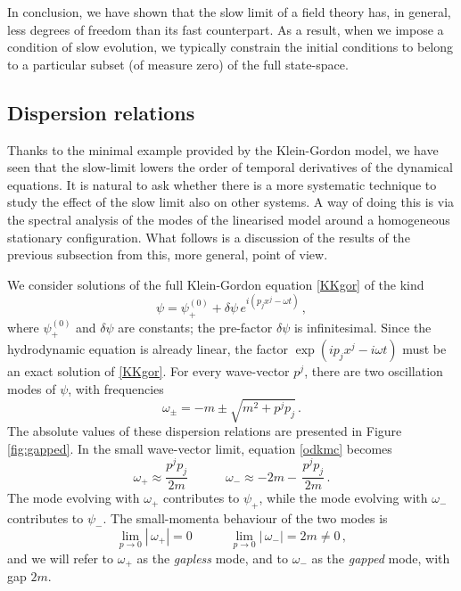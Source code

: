 \documentclass[a4paper, amsfonts, amssymb, amsmath, reprint, twocolumn, showkeys, nofootinbib]{revtex4-2}
\begin{document}
In conclusion, we have shown that the slow limit of a field theory has, in general, less degrees of freedom than its fast counterpart. As a result, when we impose a condition of slow evolution, we typically constrain the initial conditions to belong to a particular subset (of measure zero) of the full state-space. 

\subsection{Dispersion relations}\label{Latechnicadeimodi}
 
Thanks to the minimal example provided by the Klein-Gordon model, we have seen that the slow-limit lowers the order of temporal derivatives of the dynamical equations. 
It is natural to ask whether there is a more systematic technique to study the effect of the slow limit also on other systems. 
A way of doing this is via  the spectral analysis of the modes of the linearised model around a homogeneous stationary configuration. 
What follows is a discussion of the results of the previous subsection from this, more general, point of view.

We consider solutions of the full Klein-Gordon equation \eqref{KKgor} of the kind
\begin{equation}
\psi= \psi_+^{(0)} + \delta \psi \, e^{i(p_j x^j-\omega t)} \, ,
\end{equation} 
where $\psi_+^{(0)}$ and $\delta \psi$ are constants; the pre-factor $\delta \psi$ is infinitesimal. Since the hydrodynamic equation is already linear, the factor $\exp(ip_j x^j-i\omega t)$ must be an exact solution of \eqref{KKgor}.   
For every wave-vector $p^j$, there are two oscillation modes of  $\psi$, with frequencies
\begin{equation}\label{odkmc}
\omega_{\pm} = -m \pm \sqrt{m^2 + p^j p_j} \, .
\end{equation}
The absolute values of these dispersion relations are presented in Figure \ref{fig:gapped}. In the small wave-vector limit, equation \eqref{odkmc} becomes
\begin{equation}
\omega_+ \approx \dfrac{p^j p_j}{2m}  \quad  \quad \quad    
\omega_- \approx -2m- \, \dfrac{p^j p_j}{2m} \, .
\end{equation}
The  mode evolving with $\omega_+$  contributes to $\psi_+$, while the  mode evolving with $\omega_-$ contributes to $\psi_-$. The small-momenta behaviour of the two modes is
\begin{equation}
\lim_{p \rightarrow 0} \left\lvert \, \omega_+ \right\rvert =0
\quad \quad \quad 
\lim_{p \rightarrow 0} \left\lvert \, \omega_- \right\rvert =2m \neq 0 \, ,
\end{equation}
and  we will refer to $\omega_+$ as the \emph{gapless} mode, and  to $\omega_-$ as the \emph{gapped} mode, with gap $2 m$.
\end{document}
